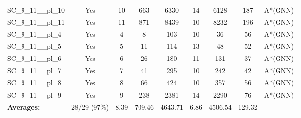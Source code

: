 \documentclass{article}
\begin{document}
\begin{tabular}{lcccccccc}
SC\_9\_11\_\_pl\_10 & Yes & 10 & 663 & 6330 & 14 & 6128 & 187 & A*(GNN) \\
SC\_9\_11\_\_pl\_11 & Yes & 11 & 871 & 8439 & 10 & 8232 & 196 & A*(GNN) \\
SC\_9\_11\_\_pl\_4 & Yes & 4 & 8 & 103 & 10 & 36 & 56 & A*(GNN) \\
SC\_9\_11\_\_pl\_5 & Yes & 5 & 11 & 114 & 13 & 48 & 52 & A*(GNN) \\
SC\_9\_11\_\_pl\_6 & Yes & 6 & 26 & 180 & 11 & 131 & 37 & A*(GNN) \\
SC\_9\_11\_\_pl\_7 & Yes & 7 & 41 & 295 & 10 & 242 & 42 & A*(GNN) \\
SC\_9\_11\_\_pl\_8 & Yes & 8 & 66 & 424 & 10 & 357 & 56 & A*(GNN) \\
SC\_9\_11\_\_pl\_9 & Yes & 9 & 238 & 2381 & 14 & 2290 & 76 & A*(GNN) \\
\textbf{Averages:} & 28/29 (97\%) & 8.39 & 709.46 & 4643.71 & 6.86 & 4506.54 & 129.32 & \\
\bottomrule
\end{tabular}
\\[0.7cm]
\end{document}
